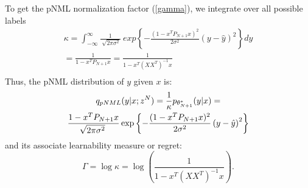 \documentclass[conference,letterpaper]{IEEEtran}
\begin{document}
To get the pNML normalization factor (\ref{gamma}), we integrate over all possible labels
\begin{multline}
\kappa = %
\int_{-\infty}^{\infty} \frac{1}{\sqrt[]{2\pi\sigma^2}}
\ exp\left\{-\frac{(1 - x^T P_{N+1} x )^2 }{2\sigma^2}
\left(y- \hat{y} \right)^2\right\} dy\\ 
=\frac{1}{1 - x^T P_{N+1} x } 
=\frac{1}{1 - x^T (XX^T)^{-1} x } \\
\end{multline}
Thus, the pNML distribution of $y$ given $x$ is:
\begin{multline}
q_{\mbox{\tiny{pNML}}}(y | x; z^N) = \frac{1}{\kappa}p_{\theta_{N+1}^*}(y|x) = \\
\frac{1 - x^T P_{N+1} x }{\sqrt[]{2\pi\sigma^2}}
\exp\left\{-\frac{(1 - x^T P_{N+1} x )^2 }{2\sigma^2}\left(y-\hat{y} \right)^2\right\} \\
\end{multline}
and its associate learnability measure or regret:
\begin{equation} \label{eq:regret}
\Gamma = \log \kappa = \log\left(\frac{1}{1 - x^T (XX^T)^{-1} x } \right).
\end{equation}

\end{document}
